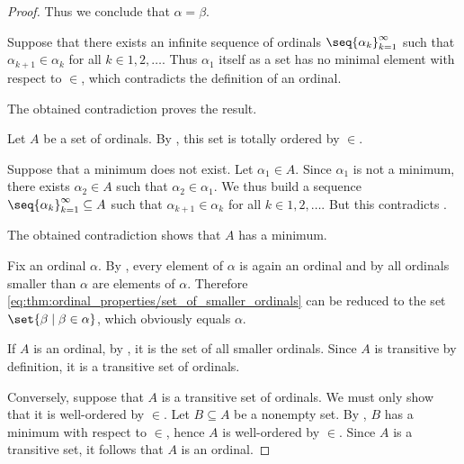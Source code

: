 \begin{proof}
  Thus we conclude that \( \alpha = \beta \).

   Suppose that there exists an infinite sequence of ordinals \( \seq{ \alpha_k }_{k=1}^\infty \) such that \( \alpha_{k+1} \in \alpha_k \) for all \( k \in 1, 2, \ldots \). Thus \( \alpha_1 \) itself as a set has no minimal element with respect to \( \in \), which contradicts the definition of an ordinal.

  The obtained contradiction proves the result.

   Let \( A \) be a set of ordinals. By , this set is totally ordered by \( \in \).

  Suppose that a minimum does not exist. Let \( \alpha_1 \in A \). Since \( \alpha_1 \) is not a minimum, there exists \( \alpha_2 \in A \) such that \( \alpha_2 \in \alpha_1 \). We thus build a sequence \( \seq{ \alpha_k }_{k=1}^\infty \subseteq A \) such that \( \alpha_{k+1} \in \alpha_k \) for all \( k \in 1, 2, \ldots \). But this contradicts .

  The obtained contradiction shows that \( A \) has a minimum.

   Fix an ordinal \( \alpha \). By , every element of \( \alpha \) is again an ordinal and by  all ordinals smaller than \( \alpha \) are elements of \( \alpha \). Therefore \eqref{eq:thm:ordinal_properties/set_of_smaller_ordinals} can be reduced to the set \( \set{ \beta \given \beta \in \alpha } \), which obviously equals \( \alpha \).

   If \( A \) is an ordinal, by , it is the set of all smaller ordinals. Since \( A \) is transitive by definition, it is a transitive set of ordinals.

  Conversely, suppose that \( A \) is a transitive set of ordinals. We must only show that it is well-ordered by \( \in \). Let \( B \subseteq A \) be a nonempty set. By , \( B \) has a minimum with respect to \( \in \), hence \( A \) is well-ordered by \( \in \). Since \( A \) is a transitive set, it follows that \( A \) is an ordinal.
\end{proof}

